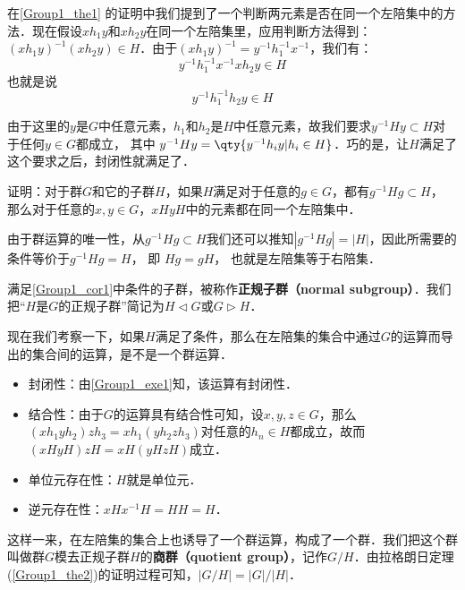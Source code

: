 在\autoref{Group1_the1} 的证明中我们提到了一个判断两元素是否在同一个左陪集中的方法．现在假设$xh_1y$和$xh_2y$在同一个左陪集里，应用判断方法得到：$(xh_1y)^{-1}(xh_2y)\in H$．由于$(xh_1y)^{-1}=y^{-1}h_1^{-1}x^{-1}$，我们有：$$y^{-1}h_1^{-1}x^{-1}xh_2y\in H$$
也就是说$$y^{-1}h^{-1}_1h_2y\in H$$

由于这里的$y$是$G$中任意元素，$h_1$和$h_2$是$H$中任意元素，故我们要求$y^{-1}Hy\subset H$对于任何$y\in G$都成立， 其中 $y^{-1}Hy = \qty{y^{-1}h_i y|h_i \in H}$．巧的是，让$H$满足了这个要求之后，封闭性就满足了．

\begin{exercise}{}\label{Group1_exe1}
证明：对于群$G$和它的子群$H$，如果$H$满足对于任意的$g\in G$，都有$g^{-1}Hg\subset H$， 那么对于任意的$x, y\in G$，$xHyH$中的元素都在同一个左陪集中．
\end{exercise}

\begin{corollary}{}\label{Group1_cor1}
由于群运算的唯一性，从$g^{-1}Hg\subset H$我们还可以推知$|g^{-1}Hg|=|H|$，因此所需要的条件等价于$g^{-1}Hg=H$， 即 $Hg = gH$， 也就是左陪集等于右陪集．
\end{corollary}

满足\autoref{Group1_cor1}中条件的子群，被称作\textbf{正规子群（normal subgroup）}．我们把“$H$是$G$的正规子群”简记为$H\triangleleft G$或$G\triangleright H$．

现在我们考察一下，如果$H$满足了条件，那么在左陪集的集合中通过$G$的运算而导出的集合间的运算，是不是一个群运算．
\begin{itemize}
\item 封闭性：由\autoref{Group1_exe1}知，该运算有封闭性．
\item 结合性：由于$G$的运算具有结合性可知，设$x, y, z\in G$，那么$(xh_1yh_2)zh_3=xh_1(yh_2zh_3)$对任意的$h_n\in H$都成立，故而$(xHyH)zH=xH(yHzH)$成立．
\item 单位元存在性：$H$就是单位元．
\item 逆元存在性：$xHx^{-1}H=HH=H$．
\end{itemize}

这样一来，在左陪集的集合上也诱导了一个群运算，构成了一个群．我们把这个群叫做群$G$模去正规子群$H$的\textbf{商群（quotient group）}，记作$G/H$．由拉格朗日定理(\autoref{Group1_the2})的证明过程可知，$|G/H|={|G|}/{|H|}$．

